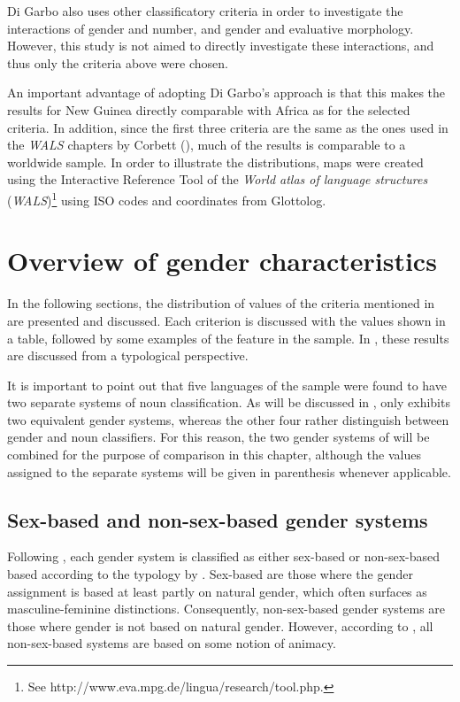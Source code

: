 \documentclass[output=collectionpaper]{langsci/langscibook}
\begin{document}
Di Garbo also uses other classificatory criteria in order to investigate the interactions of gender and number, and gender and evaluative morphology. However, this study is not aimed to directly investigate these interactions, and thus only the criteria above were chosen.


An important advantage of adopting Di Garbo's approach is that this makes the results for New Guinea directly comparable with Africa as for the selected criteria. In addition, since the first three criteria are the same as the ones used in the \textit{WALS} chapters by Corbett (\citealt{Corbett2013,Corbett2013a,Corbett2013b}), much of the results is comparable to a worldwide sample. In order to illustrate the distributions, maps were created using the Interactive Reference Tool of the \textit{World atlas of language structures} (\textit{WALS})\footnote{See http://www.eva.mpg.de/lingua/research/tool.php.} using ISO codes and coordinates from Glottolog.

\section{ Overview of gender characteristics}
\label{sec:Svard:3}

In the following sections, the distribution of values of the criteria mentioned in  are presented and discussed. Each criterion is discussed with the values shown in a table, followed by some examples of the feature in the sample. In , these results are discussed from a typological perspective.

It is important to point out that five languages of the sample were found to have two separate systems of noun classification. As will be discussed in , only  exhibits two equivalent gender systems, whereas the other four rather distinguish between gender and noun classifiers. For this reason, the two gender systems of  will be combined for the purpose of comparison in this chapter, although the values assigned to the separate systems will be given in parenthesis whenever applicable.

\subsection{ Sex-based and non-sex-based gender systems}
\label{sec:Svard:3.1}

Following \citet[62]{DiGarbo2014}, each gender system is classified as either sex-based or non-sex-based based according to the typology by \citet{Corbett2013b}. Sex-based are those where the gender assignment is based at least partly on natural gender, which often surfaces as masculine-feminine distinctions. Consequently, non-sex-based gender systems are those where gender is not based on natural gender. However, according to \citet{Corbett2013b}, all non-sex-based systems are based on some notion of animacy.
\end{document}
